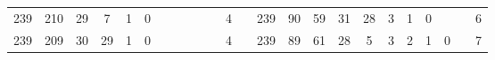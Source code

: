 {\begin{tabular}{cccccccccccclccccccccccc}
239                                                & 210                                                & 29                                               & 7                                                & 1                                                & 0                                                &                                                 &                                                 &                                                 &                                                 &                                                 & 4                                                &                          & 239                                                & 90                                                 & 59                                               & 31                                               & 28                                              & 3                                               & 1                                               & 0                                               &                                                 &                                                 & 6                                                \\
239                                                & 209                                                & 30                                               & 29                                               & 1                                                & 0                                                &                                                 &                                                 &                                                 &                                                 &                                                 & 4                                                &                          & 239                                                & 89                                                 & 61                                               & 28                                               & 5                                               & 3                                               & 2                                               & 1                                               & 0                                               &                                                 & 7                                                \\

\end{tabular}}
